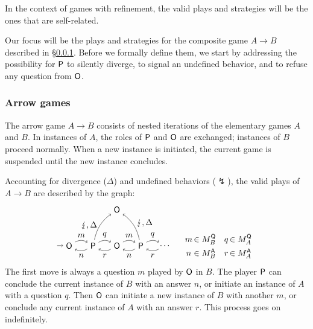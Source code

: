 In the context of games with refinement,
the valid plays and strategies will be the ones
that are self-related.

Our focus will be the plays and strategies
for the composite game $A \rightarrow B$
described in \S\ref{sec:arrow}.
Before we formally define them,
we start by addressing
the possibility for $ \mathsf{P} $ to silently diverge,
to signal an undefined behavior,
and to refuse any question from $ \mathsf{O} $.


\subsubsection{Arrow games} %
\label{sec:arrow}

The arrow game $A \rightarrow B$ consists of
nested iterations of the elementary games $A$ and $B$.
In instances of $A$, the roles of $ \mathsf{P} $ and $ \mathsf{O} $ are exchanged;
instances of $B$ proceed normally.
When a new instance is initiated,
the current game is suspended
until the new instance concludes.

Accounting for divergence ($\Delta$) and undefined behaviors ($\lightning$),
the valid plays of $A \rightarrow B$
are described by the graph:
\[
  \begin{tikzpicture}[baseline=(O1.base)]
    \node (O1) at (0,0) {\kw{O}};
    \node (P1) at (1,0) {\kw{P}};
    \node (O2) at (2,0) {\kw{O}};
    \node (P2) at (3,0) {\kw{P}};
    \node (O3) at (4,0) {$\ldots$};
    \node (H) at (2,1.5) {\kw{O}};
    \path [->] (-0.5,0) edge (O1);
    \path [->] (O1) edge[bend left] node[auto] {$m$} (P1);
    \path [->] (P1) edge[bend left] node[auto] {$n$} (O1);
    \path [->] (P1) edge[bend left] node[auto] {$q$} (O2);
    \path [->] (P1) edge[bend left=20] node[auto,anchor=east] {$\lightning, \Delta$} (H);
    \path [->] (O2) edge[bend left] node[auto] {$r$} (P1);
    \path [->] (O2) edge[bend left] node[auto] {$m$} (P2);
    \path [->] (P2) edge[bend left] node[auto] {$n$} (O2);
    \path [->] (P2) edge[bend left] node[auto] {$q$} (O3);
    \path [->] (P2) edge[bend right=20] node[anchor=base west] {$\lightning, \Delta$} (H);
    \path [->] (O3) edge[bend left] node[auto] {$r$} (P2);
  \end{tikzpicture}
  \quad
  \begin{array}{c@{\,}lc@{\,}l}
    m &\in M_B^\kw{Q} & q &\in M_A^\kw{Q} \\[1ex]
    n &\in M_B^\kw{A} & r &\in M_A^\kw{A}
  \end{array}
\]
The first move is always a question $m$ played by $ \mathsf{O} $ in $B$.
The player $ \mathsf{P} $ can conclude the current instance of $B$
with an answer $n$, or
initiate an instance of $A$
with a question $q$.
Then $ \mathsf{O} $ can initiate a new instance of $B$
with another $m$, or
conclude any current instance of $A$
with an answer $r$.
This process goes on indefinitely.

